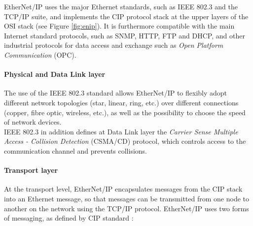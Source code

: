 EtherNet/IP uses the major Ethernet standards, such as IEEE 802.3 and the TCP/IP suite, and implements the CIP protocol stack at the upper layers of the OSI stack (see Figure \ref{fig:enip}). It is furthermore compatible with the main Internet standard protocols, such as SNMP, HTTP, FTP and DHCP, and other industrial protocols for data access and exchange such as \textit{Open Platform Communication} (OPC).

\paragraph{Physical and Data Link layer}

The use of the IEEE 802.3 standard allows EtherNet/IP to flexibly adopt different network topologies (star, linear, ring, etc.) over different connections (copper, fibre optic, wireless, etc.), as well as the possibility to choose the speed of network devices. \\
IEEE 802.3 in addition defines at Data Link layer the \textit{Carrier Sense Multiple Access - Collision Detection} (CSMA/CD) protocol, which controls access to the communication channel and prevents collisions.

\paragraph{Transport layer} 

At the transport level, EtherNet/IP encapsulates messages from the CIP stack into an Ethernet message, so that messages can be transmitted from one node to another on the network using the TCP/IP protocol. EtherNet/IP uses two forms of messaging, as
defined by CIP standard \cite{enip_pdf}\cite{enip_pdf2}:

